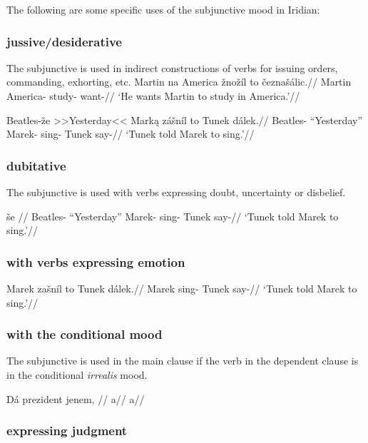 \par The following are some specific uses of the subjunctive mood in Iridian:
\subsubsection{jussive/desiderative}
\par The subjunctive is used in indirect constructions of verbs for issuing orders, commanding, exhorting, etc.
\pex
\begingl
\gla Martin na America \v{z}no\v{z}\'il to \v{c}ezna\v{s}\'alic.//
\glb Martin  America- study-  want-//
\glft `He wants Martin to study in America.'//
\endgl
\xe

\pex
\begingl
\gla Beatles-\v{z}e >>Yesterday<< Mark\k{a} z\'a\v{s}n\'il to Tunek dálek.//
\glb Beatles- ``Yesterday'' Marek- sing-  Tunek say-//
\glft `Tunek told Marek to sing.'//
\endgl
\xe

\subsubsection{dubitative}
\par The subjunctive is used with verbs expressing doubt, uncertainty or disbelief.

\pex
\begingl
\gla \v{s}e //
\glb Beatles- ``Yesterday'' Marek- sing-  Tunek say-//
\glft `Tunek told Marek to sing.'//
\endgl
\xe

\subsubsection{with verbs expressing emotion}

\pex
\begingl
\gla Marek za\v{s}n\'il to Tunek dálek.//
\glb Marek sing-  Tunek say-//
\glft `Tunek told Marek to sing.'//
\endgl
\xe


\subsubsection{with the conditional mood}
\par The subjunctive is used in the main clause if the verb in the dependent clause is in the conditional \textit{irrealis} mood.

\pex
\begingl
\gla Dá prezident jenem, //
\glb a//
\glft a//
\endgl
\xe

\subsubsection{expressing judgment}

